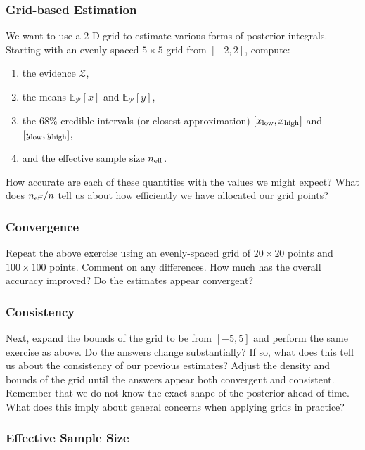 \documentclass[12pt, titlepage]{article}
\newcommand{\meanwrt}[2]{\ensuremath{\mathbb{E}_{{#2}}\left[{#1}\right]}}
\newcommand{\posterior}{\ensuremath{\mathcal{P}}}
\newcommand{\evidence}{\ensuremath{\mathcal{Z}}}
\begin{document}
\subsubsection*{Grid-based Estimation}

We want to use a 2-D grid to estimate various forms of posterior integrals.
Starting with an evenly-spaced $5 \times 5$ grid from $[-2, 2]$, compute:
\begin{enumerate}
    \item the evidence $\evidence$,
    \item the means $\meanwrt{x}{\posterior}$
    and $\meanwrt{y}{\posterior}$,
    \item the 68\% credible intervals (or closest approximation) 
    $[x_{\rm low}, x_{\rm high}]$ and $[y_{\rm low}, y_{\rm high}]$,
    \item and the effective sample size $n_{\rm eff}$.
\end{enumerate}
How accurate are each of these quantities with the values we might
expect? What does $n_{\rm eff}/n$ tell us about how efficiently
we have allocated our grid points?

\subsubsection*{Convergence}

Repeat the above exercise using an evenly-spaced grid of
$20 \times 20$ points and $100 \times 100$ points. Comment
on any differences. How much has the overall accuracy improved? Do
the estimates appear convergent?

\subsubsection*{Consistency}

Next, expand the bounds of the grid to be from $[-5, 5]$ and
perform the same exercise as above. Do the answers change substantially?
If so, what does this tell us about the consistency of our previous
estimates? Adjust the density and bounds of the grid until the 
answers appear both convergent and consistent.
Remember that we do not know the exact shape of the posterior 
ahead of time. What does this imply
about general concerns when applying grids in practice?

\subsubsection*{Effective Sample Size}
\end{document}
